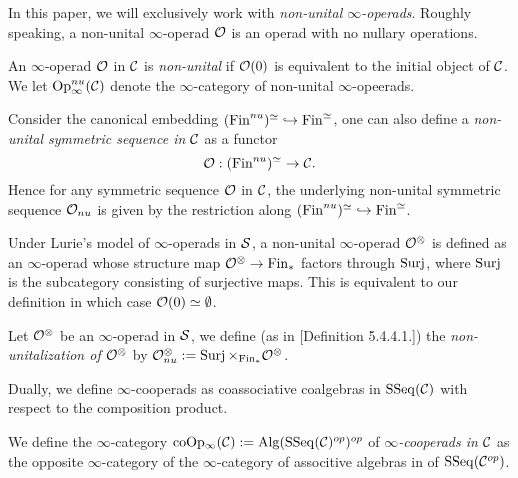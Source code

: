 In this paper, we will exclusively work with \emph{non-unital $\infty$-operads}. Roughly speaking, a non-unital $\infty$-operad ${\mathcal{O}}$ is an operad with no nullary operations.
\begin{definition}
	\label{non-unital operad}
	An $\infty$-operad ${\mathcal{O}}$ in ${\mathcal{C}}$ is \emph{non-unital} if ${\mathcal{O}}(0)$ is equivalent to the initial object of ${\mathcal{C}}$. We let $\operatorname{Op}_{\infty}^{nu}({\mathcal{C}})$ denote the $\infty$-category of non-unital $\infty$-opeerads.
\end{definition}

\begin{remark}
Consider the canonical embedding $(\operatorname{Fin}^{nu})^{\simeq}\hookrightarrow \operatorname{Fin}^{\simeq}$, one can also define a \emph{non-unital symmetric sequence in ${\mathcal{C}}$}  as a functor 
\[
{\mathcal{O}}:(\operatorname{Fin}^{nu})^{\simeq}\to {\mathcal{C}}.
\]
Hence for any symmetric sequence ${\mathcal{O}}$ in ${\mathcal{C}}$, 
the underlying non-unital symmetric sequence ${\mathcal{O}}_{nu}$ is given by the restriction along $(\operatorname{Fin}^{nu})^{\simeq}\hookrightarrow \operatorname{Fin}^{\simeq}$.
\end{remark}

\begin{remark}
	Under Lurie's model of $\infty$-operads in $\operatorname{\mathcal{S}}$, a non-unital $\infty$-operad ${\mathcal{O}}^{\otimes}$ is defined as an $\infty$-operad whose structure map ${\mathcal{O}}^{\otimes} \to \operatorname{Fin}_*$ factors through $\operatorname{Surj}$, where $\operatorname{Surj}$ is the subcategory consisting of surjective maps. This is equivalent to our definition in which case ${\mathcal{O}}(0)\simeq \emptyset$.
\end{remark}


\begin{definition}
\label{non-unitalization of operads}
		Let ${\mathcal{O}}^{\otimes}$ be an $\infty$-operad in $\operatorname{\mathcal{S}}$, we define (as in \cite{HA}[Definition 5.4.4.1.]) the \emph{non-unitalization of ${\mathcal{O}}^{\otimes}$} by ${\mathcal{O}}^{\otimes}_{nu}:= \operatorname{Surj}\times_{\operatorname{Fin}_*}{\mathcal{O}}^{\otimes}$.
\end{definition}




Dually, we define $\infty$-cooperads as coassociative coalgebras in $\operatorname{SSeq}({\mathcal{C}})$ with respect to the composition product.
\begin{definition}
	\label{infty cooperads}
	We define the $\infty$-category $\operatorname{coOp_{\infty}}({\mathcal{C}}):=\operatorname{Alg}(\operatorname{SSeq}({\mathcal{C}})^{op})^{op}$ of \emph{$\infty$-cooperads in ${\mathcal{C}}$} as the opposite $\infty$-category of the $\infty$-category of associtive algebras in of $\operatorname{SSeq}({\mathcal{C}}^{op})$.
\end{definition}








